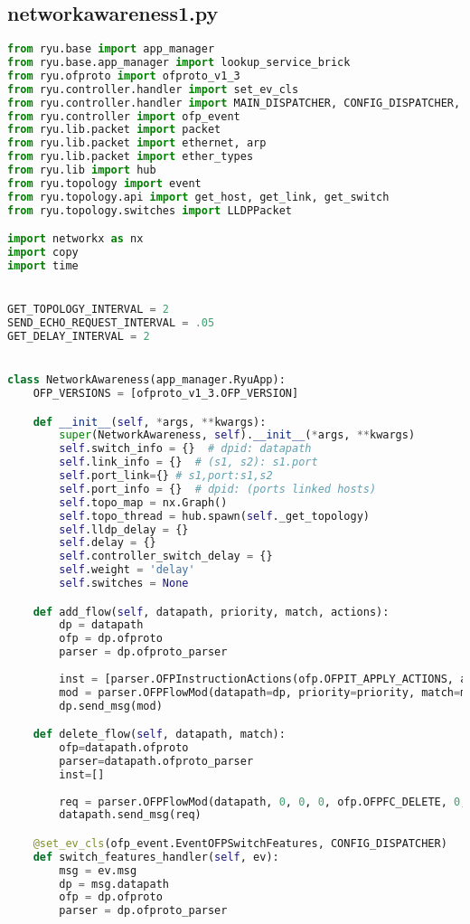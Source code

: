 \documentclass{xjtureport}
\begin{document}
\subsection{networkawareness1.py}
\begin{lstlisting}[language=python]
from ryu.base import app_manager
from ryu.base.app_manager import lookup_service_brick
from ryu.ofproto import ofproto_v1_3
from ryu.controller.handler import set_ev_cls
from ryu.controller.handler import MAIN_DISPATCHER, CONFIG_DISPATCHER, DEAD_DISPATCHER, HANDSHAKE_DISPATCHER
from ryu.controller import ofp_event
from ryu.lib.packet import packet
from ryu.lib.packet import ethernet, arp
from ryu.lib.packet import ether_types
from ryu.lib import hub
from ryu.topology import event
from ryu.topology.api import get_host, get_link, get_switch
from ryu.topology.switches import LLDPPacket

import networkx as nx
import copy
import time


GET_TOPOLOGY_INTERVAL = 2
SEND_ECHO_REQUEST_INTERVAL = .05
GET_DELAY_INTERVAL = 2


class NetworkAwareness(app_manager.RyuApp):
	OFP_VERSIONS = [ofproto_v1_3.OFP_VERSION]

	def __init__(self, *args, **kwargs):
		super(NetworkAwareness, self).__init__(*args, **kwargs)
		self.switch_info = {}  # dpid: datapath
		self.link_info = {}  # (s1, s2): s1.port
		self.port_link={} # s1,port:s1,s2
		self.port_info = {}  # dpid: (ports linked hosts)
		self.topo_map = nx.Graph()
		self.topo_thread = hub.spawn(self._get_topology)
		self.lldp_delay = {}
		self.delay = {}
		self.controller_switch_delay = {}
		self.weight = 'delay'
		self.switches = None

	def add_flow(self, datapath, priority, match, actions):
		dp = datapath
		ofp = dp.ofproto
		parser = dp.ofproto_parser
		
		inst = [parser.OFPInstructionActions(ofp.OFPIT_APPLY_ACTIONS, actions)]
		mod = parser.OFPFlowMod(datapath=dp, priority=priority, match=match, instructions=inst)
		dp.send_msg(mod)

	def delete_flow(self, datapath, match):
		ofp=datapath.ofproto
		parser=datapath.ofproto_parser
		inst=[]
		
		req = parser.OFPFlowMod(datapath, 0, 0, 0, ofp.OFPFC_DELETE, 0, 0, 0, ofp.OFP_NO_BUFFER,ofp.OFPP_ANY, ofp.OFPG_ANY,ofp.OFPFF_SEND_FLOW_REM,match, inst)
		datapath.send_msg(req)

	@set_ev_cls(ofp_event.EventOFPSwitchFeatures, CONFIG_DISPATCHER)
	def switch_features_handler(self, ev):
		msg = ev.msg
		dp = msg.datapath
		ofp = dp.ofproto
		parser = dp.ofproto_parser


\end{lstlisting}
\end{document}
